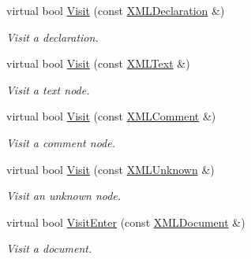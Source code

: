 \begin{DoxyCompactItemize}
\mbox{\label{classtinyxml2_1_1XMLVisitor_adc75bd459fc7ba8223b50f0616767f9a}} 
virtual bool \hyperlink{classtinyxml2_1_1XMLVisitor_adc75bd459fc7ba8223b50f0616767f9a}{Visit} (const \hyperlink{classtinyxml2_1_1XMLDeclaration}{X\+M\+L\+Declaration} \&)
\begin{DoxyCompactList}\small\item\em Visit a declaration. \end{DoxyCompactList}\item 
\mbox{\label{classtinyxml2_1_1XMLVisitor_af30233565856480ea48b6fa0d6dec65b}} 
virtual bool \hyperlink{classtinyxml2_1_1XMLVisitor_af30233565856480ea48b6fa0d6dec65b}{Visit} (const \hyperlink{classtinyxml2_1_1XMLText}{X\+M\+L\+Text} \&)
\begin{DoxyCompactList}\small\item\em Visit a text node. \end{DoxyCompactList}\item 
\mbox{\label{classtinyxml2_1_1XMLVisitor_acc8147fb5a85f6c65721654e427752d7}} 
virtual bool \hyperlink{classtinyxml2_1_1XMLVisitor_acc8147fb5a85f6c65721654e427752d7}{Visit} (const \hyperlink{classtinyxml2_1_1XMLComment}{X\+M\+L\+Comment} \&)
\begin{DoxyCompactList}\small\item\em Visit a comment node. \end{DoxyCompactList}\item 
\mbox{\label{classtinyxml2_1_1XMLVisitor_a14e4748387c34bf53d24e8119bb1f292}} 
virtual bool \hyperlink{classtinyxml2_1_1XMLVisitor_a14e4748387c34bf53d24e8119bb1f292}{Visit} (const \hyperlink{classtinyxml2_1_1XMLUnknown}{X\+M\+L\+Unknown} \&)
\begin{DoxyCompactList}\small\item\em Visit an unknown node. \end{DoxyCompactList}\item 
\mbox{\label{classtinyxml2_1_1XMLVisitor_acb3c22fc5f60eb9db98f533f2761f67d}} 
virtual bool \hyperlink{classtinyxml2_1_1XMLVisitor_acb3c22fc5f60eb9db98f533f2761f67d}{Visit\+Enter} (const \hyperlink{classtinyxml2_1_1XMLDocument}{X\+M\+L\+Document} \&)
\begin{DoxyCompactList}\small\item\em Visit a document. \end{DoxyCompactList}\item 

\end{DoxyCompactItemize}
